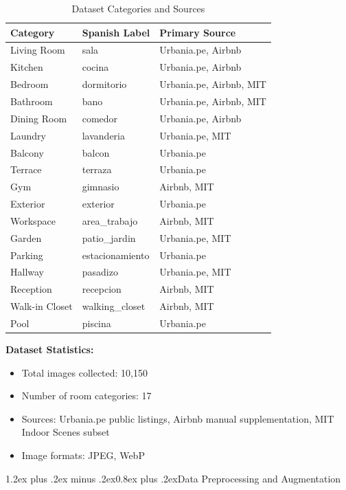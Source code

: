 \documentclass[conference]{IEEEtran}
\makeatletter
\renewcommand{\subsection}{\@startsection{subsection}{2}{\z@}%
  {1.2ex plus .2ex minus .2ex}{0.8ex plus .2ex}{\normalfont\bfseries}}
\makeatother
\begin{document}
\begin{table}[htbp]
\caption{Dataset Categories and Sources}
\begin{center}
\small
\begin{tabular}{@{}lll@{}}
\toprule
\textbf{Category} & \textbf{Spanish Label} & \textbf{Primary Source} \\
\midrule
Living Room & sala & Urbania.pe, Airbnb \\
Kitchen & cocina & Urbania.pe, Airbnb \\
Bedroom & dormitorio & Urbania.pe, Airbnb, MIT \\
Bathroom & bano & Urbania.pe, Airbnb, MIT \\
Dining Room & comedor & Urbania.pe, Airbnb \\
Laundry & lavanderia & Urbania.pe, MIT \\
Balcony & balcon & Urbania.pe \\
Terrace & terraza & Urbania.pe \\
Gym & gimnasio & Airbnb, MIT \\
Exterior & exterior & Urbania.pe \\
Workspace & area\_trabajo & Airbnb, MIT \\
Garden & patio\_jardin & Urbania.pe, MIT \\
Parking & estacionamiento & Urbania.pe \\
Hallway & pasadizo & Urbania.pe, MIT \\
Reception & recepcion & Airbnb, MIT \\
Walk-in Closet & walking\_closet & Airbnb, MIT \\
Pool & piscina & Urbania.pe \\
\bottomrule
\end{tabular}
\label{tab:categories}
\end{center}
\end{table}

\textbf{Dataset Statistics:}
\begin{itemize}
\item Total images collected: 10,150
\item Number of room categories: 17
\item Sources: Urbania.pe public listings, Airbnb manual supplementation, MIT Indoor Scenes subset
\item Image formats: JPEG, WebP
\end{itemize}

\subsection{Data Preprocessing and Augmentation}
\end{document}
